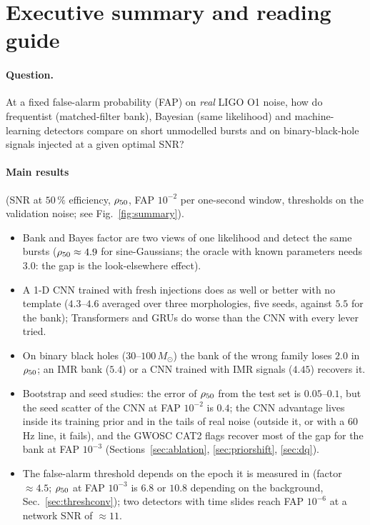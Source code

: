 \section*{Executive summary and reading guide}

\paragraph{Question.} At a fixed false-alarm probability (FAP) on \emph{real} LIGO O1 noise, how do frequentist (matched-filter bank), Bayesian (same likelihood) and machine-learning detectors compare on short unmodelled bursts and on binary-black-hole signals injected at a given optimal SNR?

\paragraph{Main results} (SNR at $50\,\%$ efficiency, $\rho_{50}$, FAP $10^{-2}$ per one-second window, thresholds on the validation noise; see Fig.~\ref{fig:summary}).
\begin{itemize}[nosep]
\item Bank and Bayes factor are two views of one likelihood and detect the same bursts ($\rho_{50}\approx4.9$ for sine-Gaussians; the oracle with known parameters needs $3.0$: the gap is the look-elsewhere effect).
\item A 1-D CNN trained with fresh injections does as well or better with no template ($4.3$--$4.6$ averaged over three morphologies, five seeds, against $5.5$ for the bank); Transformers and GRUs do worse than the CNN with every lever tried.
\item On binary black holes ($30$--$100\,M_\odot$) the bank of the wrong family loses $2.0$ in $\rho_{50}$; an IMR bank ($5.4$) or a CNN trained with IMR signals ($4.45$) recovers it.
\item Bootstrap and seed studies: the error of $\rho_{50}$ from the test set is $0.05$--$0.1$, but the seed scatter of the CNN at FAP $10^{-2}$ is $0.4$; the CNN advantage lives inside its training prior and in the tails of real noise (outside it, or with a $60\,$Hz line, it fails), and the GWOSC CAT2 flags recover most of the gap for the bank at FAP $10^{-3}$ (Sections~\ref{sec:ablation}, \ref{sec:priorshift}, \ref{sec:dq}).
\item The false-alarm threshold depends on the epoch it is measured in (factor $\approx4.5$; $\rho_{50}$ at FAP $10^{-3}$ is $6.8$ or $10.8$ depending on the background, Sec.~\ref{sec:threshconv}); two detectors with time slides reach FAP $10^{-6}$ at a network SNR of $\approx11$.
\end{itemize}
